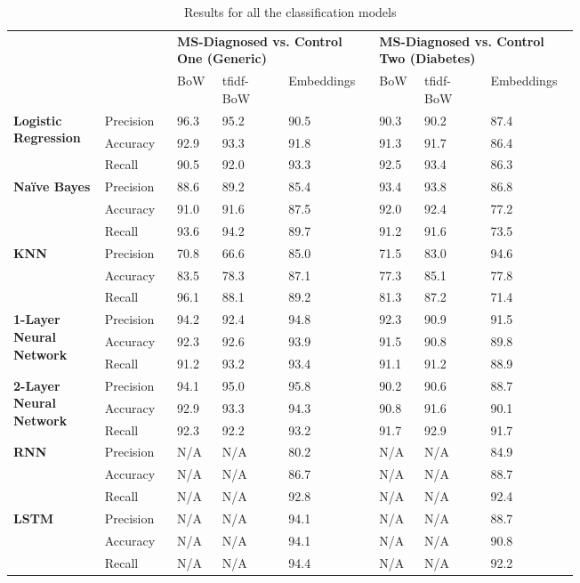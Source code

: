 \documentclass[11pt,a4paper]{article}
\begin{document}
\begin{table}[!ht]
\centering
\begin{tabular}{p{0.12\linewidth}p{0.1\linewidth}p{0.05\linewidth}p{0.1\linewidth}p{0.12\linewidth}p{0.05\linewidth}p{0.1\linewidth}p{0.1\linewidth}}
\hline\hline
 & & \multicolumn{3}{C{0.25\linewidth}}{\textbf{MS-Diagnosed vs. Control One (Generic)}} & \multicolumn{3}{C{0.25\linewidth}}{\textbf{MS-Diagnosed vs. Control Two (Diabetes)}}\\
 & & BoW & tfidf-BoW & Embeddings &  BoW & tfidf-BoW & Embeddings\\
\hline
\multirow{3}{\linewidth}{\textbf{Logistic Regression}} & Precision & 96.3 & 95.2	& 90.5 & 90.3 & 90.2 & 87.4\\
 & Accuracy & 92.9 & 93.3 & 91.8 & 91.3 & 91.7 & 86.4 \\
 & Recall & 90.5 & 92.0 & 93.3 & 92.5 & 93.4 & 86.3 \\
\hline
\multirow{3}{\linewidth}{\textbf{Naïve Bayes}} & Precision & 88.6 & 89.2 & 85.4 & 93.4 & 93.8 & 86.8\\
 & Accuracy & 91.0 & 91.6 & 87.5 & 92.0 & 92.4 & 77.2\\
 & Recall & 93.6 & 94.2 & 89.7 & 91.2 & 91.6 & 73.5\\
\hline
\multirow{3}{\linewidth}{\textbf{KNN}} & Precision & 70.8	& 66.6 & 85.0 & 71.5 & 83.0 & 94.6\\
 & Accuracy & 83.5 & 78.3 & 87.1 & 77.3 & 85.1 & 77.8\\
 & Recall & 96.1 & 88.1 & 89.2 & 81.3 & 87.2 & 71.4\\
\hline
\multirow{3}{\linewidth}{\textbf{1-Layer Neural Network}} & Precision & 94.2 & 92.4 & 94.8 & 92.3 & 90.9 & 91.5\\
 & Accuracy & 92.3 & 92.6 & 93.9 & 91.5 & 90.8 & 89.8\\
 & Recall & 91.2 & 93.2 & 93.4 & 91.1 & 91.2 & 88.9\\
\hline
\multirow{3}{\linewidth}{\textbf{2-Layer Neural Network}} & Precision & 94.1 & 95.0 & 95.8 & 90.2 & 90.6 & 88.7\\
 & Accuracy & 92.9 & 93.3 & 94.3 & 90.8 & 91.6 & 90.1\\
 & Recall & 92.3 & 92.2 & 93.2 & 91.7 & 92.9 & 91.7\\
\hline
\multirow{3}{\linewidth}{\textbf{RNN}} & Precision & N/A & N/A & 80.2 & N/A & N/A & 84.9\\
 & Accuracy & N/A & N/A & 86.7 & N/A & N/A & 88.7\\
 & Recall & N/A & N/A & 92.8 & N/A & N/A & 92.4\\
\hline
\multirow{3}{\linewidth}{\textbf{LSTM}} & Precision & N/A & N/A & 94.1 & N/A & N/A & 88.7\\
 & Accuracy & N/A & N/A & 94.1 & N/A & N/A & 90.8\\
 & Recall & N/A & N/A & 94.4 & N/A & N/A & 92.2\\
\hline\hline
\end{tabular}
\caption{Results for all the classification models}
\label{tab:results}
\end{table}
\end{document}
